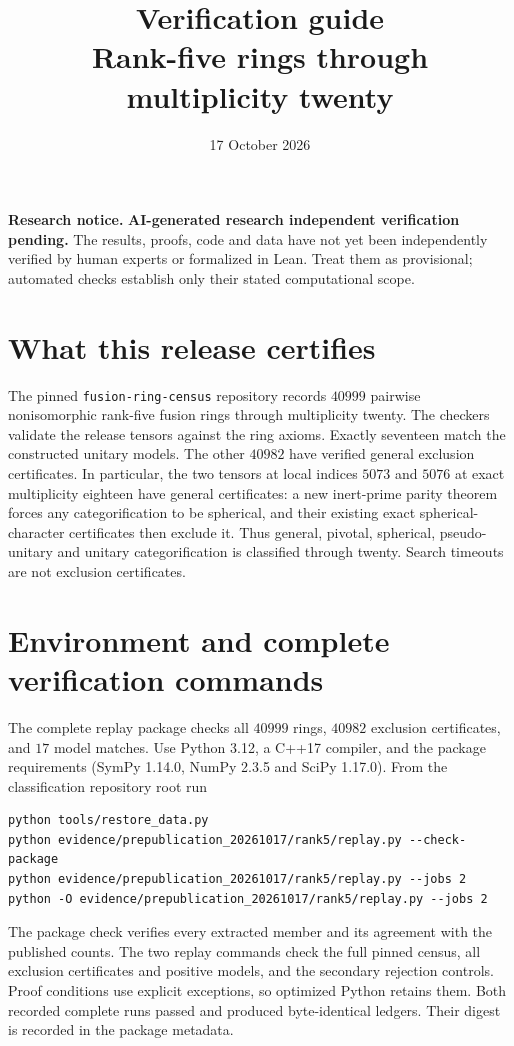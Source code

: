 \documentclass[11pt]{article}
\title{Verification guide\\Rank-five rings through multiplicity twenty}
\author{}
\date{17 October 2026}
\begin{document}
\maketitle
\par\medskip\noindent\textbf{Research notice.}
\textbf{AI-generated research \textperiodcentered{} independent verification pending.} The results, proofs, code and data have not yet
been independently verified by human experts or formalized in Lean. Treat them
as provisional; automated checks establish only their stated computational scope.
\par\medskip

\section{What this release certifies}
The pinned \texttt{fusion-ring-census} repository \cite{Census} records
$40999$ pairwise nonisomorphic rank-five fusion rings through
multiplicity twenty. The checkers validate the release tensors against
the ring axioms. Exactly
seventeen match the constructed unitary models. The other $40982$
have verified general exclusion certificates. In particular, the two
tensors at local indices $5073$ and $5076$ at
exact multiplicity eighteen have general certificates: a new
inert-prime parity theorem forces any categorification to be spherical,
and their existing exact spherical-character certificates then exclude
it. Thus general, pivotal, spherical, pseudo-unitary and unitary
categorification is classified through twenty. Search timeouts are not exclusion certificates.

\section{Environment and complete verification commands}
The complete replay package checks all $40999$ rings, $40982$ exclusion
certificates, and $17$ model matches. Use Python 3.12, a C++17 compiler,
and the package requirements (SymPy 1.14.0, NumPy 2.3.5 and SciPy 1.17.0).
From the classification repository root run
\begin{verbatim}
python tools/restore_data.py
python evidence/prepublication_20261017/rank5/replay.py --check-package
python evidence/prepublication_20261017/rank5/replay.py --jobs 2
python -O evidence/prepublication_20261017/rank5/replay.py --jobs 2
\end{verbatim}
The package check verifies every extracted member and its agreement with the
published counts. The two replay commands check the full pinned census, all
exclusion certificates and positive models, and the secondary rejection
controls. Proof conditions use explicit exceptions, so optimized Python
retains them. Both recorded complete runs passed and produced byte-identical
ledgers. Their digest is recorded in the package metadata.
\end{document}
